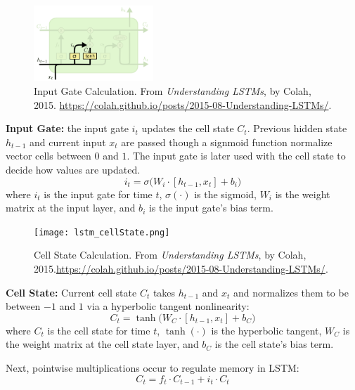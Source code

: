 \begin{program}
\begin{figure}
\vspace{-20pt}
\begin{center}
    \includegraphics[width=0.4\textwidth]{imgs/lstm_inputGate.png}
\end{center}
\vspace{-20pt}
\caption{\footnotesize Input Gate Calculation. From \emph{Understanding LSTMs}, by Colah, 2015. \url{https://colah.github.io/posts/2015-08-Understanding-LSTMs/}. } 
\vspace{-5pt}
\end{figure}
\textbf{Input Gate: } the input gate $i_t$ updates the cell state $C_t$. Previous hidden state $h_{t-1}$ and current input $x_t$ are passed though a signmoid function normalize vector cells between $0$ and $1$. The input gate is later used with the cell state to decide how values are updated. 
$$
i_t = \sigma \Big( W_i \cdot [h_{t-1}, x_t] + b_i \Big)
$$
where $i_t$ is the input gate for time $t$, $\sigma(\cdot)$ is the sigmoid, $W_i$ is the weight matrix at the input layer, and $b_i$ is the input gate's bias term. \par \kern 5pt
\end{program}





\begin{program}
\begin{figure}
\vspace{-20pt}
\begin{center}
    \texttt{[image: lstm\_cellState.png]}    
\end{center}
\vspace{-20pt}
\caption{\footnotesize Cell State Calculation. From \emph{Understanding LSTMs}, by Colah, 2015.\url{https://colah.github.io/posts/2015-08-Understanding-LSTMs/}. }
\vspace{-5pt}
\end{figure}

\textbf{Cell State: } Current cell state $C_t$ takes $h_{t-1}$ and $x_t$ and normalizes them to be between $-1$ and $1$ via a hyperbolic tangent nonlinearity:
$$
C_t = \tanh \Big( W_C \cdot [h_{t-1}, x_t] + b_C \Big)
$$
where $C_t$ is the cell state for time $t$, $\tanh(\cdot)$ is the hyperbolic tangent, $W_C$ is the weight matrix at the cell state layer, and $b_C$ is the cell state's bias term. 

Next, pointwise multiplications occur to regulate memory in LSTM: 
$$
C_t = f_t \cdot C_{t-1} + i_t \cdot C_t
$$
\end{program}


